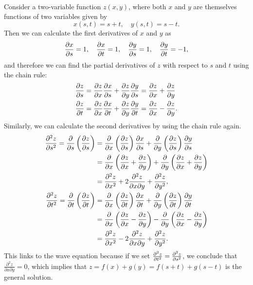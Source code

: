 \documentclass[../multivariate_calculus.tex]{subfiles}
\begin{document}
        \begin{example}\label{ex:chain-rule}
            Consider a two-variable function $z(x,y)$, where both $x$ and $y$ are themselves functions of two variables given by
            \begin{equation}
                x(s,t)=s+t,\quad y(s,t)=s-t.
            \end{equation}
            Then we can calculate the first derivatives of $x$ and $y$ as
            \begin{equation}
                \pdv{x}{s}=1,\quad\pdv{x}{t}=1,\quad\pdv{y}{s}=1,\quad\pdv{y}{t}=-1,
            \end{equation}
            and therefore we can find the partial derivatives of $z$ with respect to $s$ and $t$ using the chain rule:
            \begin{align}
                \pdv{z}{s}&=\pdv{z}{x}\pdv{x}{s}+\pdv{z}{y}\pdv{y}{s}=\pdv{z}{x}+\pdv{z}{y}\\
                \pdv{z}{t}&=\pdv{z}{x}\pdv{x}{t}+\pdv{z}{y}\pdv{y}{t}=\pdv{z}{x}-\pdv{z}{y}.
            \end{align}
            Similarly, we can calculate the second derivatives by using the chain rule again.
            \begin{align}
                \pdv[2]{z}{s}=\pdv{}{s}\left(\pdv{z}{s}\right)&=\pdv{}{x}\left(\pdv{z}{s}\right)\pdv{x}{s}+\pdv{}{y}\left(\pdv{z}{s}\right)\pdv{y}{s}\\
                &=\pdv{}{x}\left(\pdv{z}{x}+\pdv{z}{y}\right)+\pdv{}{y}\left(\pdv{z}{x}+\pdv{z}{y}\right)\\
                &=\pdv[2]{z}{x}+2\frac{\partial^2 z}{\partial x\partial y}+\pdv[2]{z}{y},\\
                \pdv[2]{z}{t}=\pdv{}{t}\left(\pdv{z}{t}\right)&=\pdv{}{x}\left(\pdv{z}{t}\right)\pdv{x}{t}+\pdv{}{y}\left(\pdv{z}{t}\right)\pdv{y}{t}\\
                &=\pdv{}{x}\left(\pdv{z}{x}-\pdv{z}{y}\right)-\pdv{}{y}\left(\pdv{z}{x}-\pdv{z}{y}\right)\\
                &=\pdv[2]{z}{x}-2\frac{\partial^2 z}{\partial x\partial y}+\pdv[2]{z}{y}.
            \end{align}
            This links to the wave equation because if we set $\pdv[2]{z}{t}=\pdv[2]{z}{s}$, we conclude that $\frac{\partial^2 z}{\partial x\partial y}=0$, which implies that $z=f(x)+g(y)=f(s+t)+g(s-t)$ is the general solution.
        \end{example}
\end{document}
